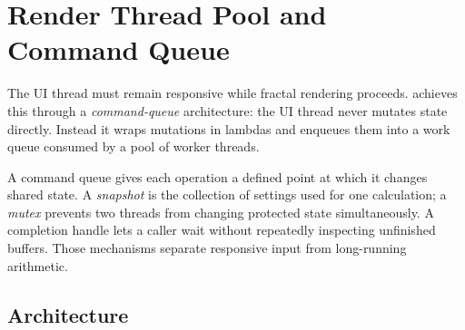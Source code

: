\section{Render Thread Pool and Command Queue}
\label{sec:render-thread-pool}

The UI thread must remain responsive while fractal rendering proceeds.
\FractalShark{} achieves this through a \emph{command-queue} architecture:
the UI thread never mutates  state directly.  Instead it wraps
mutations in lambdas and enqueues them into a work queue consumed by a pool of
worker threads.

A command queue gives each operation a defined point at which it changes shared
state. A \emph{snapshot} is the collection of settings used for one calculation;
a \emph{mutex} prevents two threads from changing protected state simultaneously.
A completion handle lets a caller wait without repeatedly inspecting unfinished
buffers. Those mechanisms separate responsive input from long-running arithmetic.

\subsection{Architecture}

